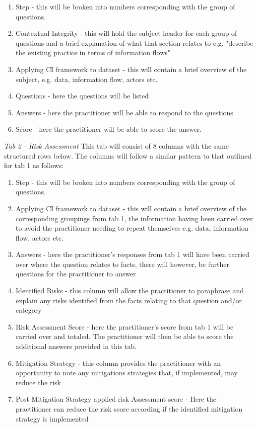 \begin{enumerate}
\item Step - this will be broken into numbers corresponding with the group of questions. 
\item Contextual Integrity - this will hold the subject header for each group of questions and a brief explanation of what that section relates to e.g. "describe the existing practice in terms of information flows" 
\item Applying CI framework to dataset - this will contain a brief overview of the subject, e.g. data, information flow, actors etc.
\item Questions - here the questions will be listed
\item Answers - here the practitioner will be able to respond to the questions
\item Score - here the practitioner will be able to score the answer.
\end {enumerate}

{\it Tab 2 - Risk Assessment}
This tab will consist of 8 columns with the same structured rows below. The columns will follow a similar pattern to that outlined for tab 1 as follows:

 \begin{enumerate}
\item Step - this will be broken into numbers corresponding with the group of questions. 
\item Applying CI framework to dataset - this will contain a brief overview of the corresponding groupings from tab 1, the information having been carried over to avoid the practitioner needing to repeat themselves e.g. data, information flow, actors etc.
\item Answers - here the practitioner's responses from tab 1 will have been carried over where the question relates to facts, there will however, be further questions for the practitioner to answer 
\item Identified Risks - this column will allow the practitioner to paraphrase  and explain any risks identified from the facts relating to that question and/or category
\item Risk Assessment Score - here the practitioner's score from tab 1 will be carried over and totaled. The practitioner will then be able to score the additional answers provided in this tab.
\item Mitigation Strategy - this column provides the practitioner with an opportunity to note any mitigations strategies that, if implemented, may reduce the risk
\item Post Mitigation Strategy applied risk Assessment score - Here the practitioner can reduce the risk score according if the identified mitigation strategy is implemented
\end {enumerate}

